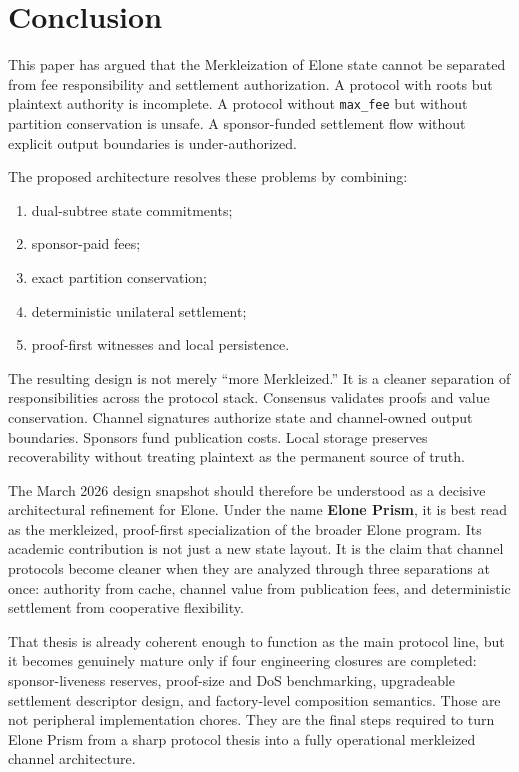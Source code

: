 \documentclass[11pt,a4paper]{article}
\newcommand{\code}[1]{\texttt{#1}}
\begin{document}
\section{Conclusion}

This paper has argued that the Merkleization of Elone state cannot be separated from fee responsibility and settlement authorization. A protocol with roots but plaintext authority is incomplete. A protocol without \code{max\_fee} but without partition conservation is unsafe. A sponsor-funded settlement flow without explicit output boundaries is under-authorized.

The proposed architecture resolves these problems by combining:
\begin{enumerate}
    \item dual-subtree state commitments;
    \item sponsor-paid fees;
    \item exact partition conservation;
    \item deterministic unilateral settlement;
    \item proof-first witnesses and local persistence.
\end{enumerate}

The resulting design is not merely ``more Merkleized.'' It is a cleaner separation of responsibilities across the protocol stack. Consensus validates proofs and value conservation. Channel signatures authorize state and channel-owned output boundaries. Sponsors fund publication costs. Local storage preserves recoverability without treating plaintext as the permanent source of truth.

The March 2026 design snapshot should therefore be understood as a decisive architectural refinement for Elone. Under the name \textbf{Elone Prism}, it is best read as the merkleized, proof-first specialization of the broader Elone program. Its academic contribution is not just a new state layout. It is the claim that channel protocols become cleaner when they are analyzed through three separations at once: authority from cache, channel value from publication fees, and deterministic settlement from cooperative flexibility.

That thesis is already coherent enough to function as the main protocol line, but it becomes genuinely mature only if four engineering closures are completed: sponsor-liveness reserves, proof-size and DoS benchmarking, upgradeable settlement descriptor design, and factory-level composition semantics. Those are not peripheral implementation chores. They are the final steps required to turn Elone Prism from a sharp protocol thesis into a fully operational merkleized channel architecture.
\end{document}

